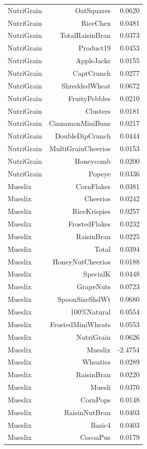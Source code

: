 \begin{longtable}{@{}lrr@{}}
NutriGrain & OatSquares & 0.0620 \\
NutriGrain & RiceChex & 0.0481 \\
NutriGrain & TotalRaisinBran & 0.0373 \\
NutriGrain & Product19 & 0.0453 \\
NutriGrain & AppleJacks & 0.0155 \\
NutriGrain & CaptCrunch & 0.0277 \\
NutriGrain & ShreddedWheat & 0.0672 \\
NutriGrain & FruityPebbles & 0.0210 \\
NutriGrain & Clusters & 0.0181 \\
NutriGrain & CinnamonMiniBuns & 0.0217 \\
NutriGrain & DoubleDipCrunch & 0.0444 \\
NutriGrain & MultiGrainCheerios & 0.0153 \\
NutriGrain & Honeycomb & 0.0200 \\
NutriGrain & Popeye & 0.0336 \\
Mueslix & CornFlakes & 0.0381 \\
Mueslix & Cheerios & 0.0242 \\
Mueslix & RiceKrispies & 0.0257 \\
Mueslix & FrostedFlakes & 0.0232 \\
Mueslix & RaisinBran & 0.0225 \\
Mueslix & Total & 0.0394 \\
Mueslix & HoneyNutCheerios & 0.0188 \\
Mueslix & SpecialK & 0.0448 \\
Mueslix & GrapeNuts & 0.0723 \\
Mueslix & SpoonSizeShdWt & 0.0680 \\
Mueslix & 100\%Natural & 0.0554 \\
Mueslix & FrostedMiniWheats & 0.0553 \\
Mueslix & NutriGrain & 0.0626 \\
Mueslix & Mueslix & -2.4754 \\
Mueslix & Wheaties & 0.0289 \\
Mueslix & RaisinBran & 0.0220 \\
Mueslix & Muesli & 0.0370 \\
Mueslix & CornPops & 0.0148 \\
Mueslix & RaisinNutBran & 0.0403 \\
Mueslix & Basic4 & 0.0403 \\
Mueslix & CocoaPus & 0.0179 \\

\end{longtable}
